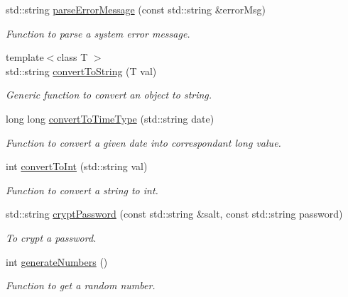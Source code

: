 \begin{DoxyCompactItemize}
std::string \hyperlink{namespacevishnu_aaf3976b9b53965c46bc9bcf847ba286f}{parseErrorMessage} (const std::string \&errorMsg)
\begin{DoxyCompactList}\small\item\em Function to parse a system error message. \item\end{DoxyCompactList}\item 
{\footnotesize template$<$class T $>$ }\\std::string \hyperlink{namespacevishnu_add18720aacc1db6052abecedd5d6feaa}{convertToString} (T val)
\begin{DoxyCompactList}\small\item\em Generic function to convert an object to string. \item\end{DoxyCompactList}\item 
long long \hyperlink{namespacevishnu_ae4208edfb8924443b0971e68cccfce02}{convertToTimeType} (std::string date)
\begin{DoxyCompactList}\small\item\em Function to convert a given date into correspondant long value. \item\end{DoxyCompactList}\item 
int \hyperlink{namespacevishnu_ac1899fb2792ddd63a003a06081fc9066}{convertToInt} (std::string val)
\begin{DoxyCompactList}\small\item\em Function to convert a string to int. \item\end{DoxyCompactList}\item 
std::string \hyperlink{namespacevishnu_a6315b6f5e86d48f4c75dc73d08348edf}{cryptPassword} (const std::string \&salt, const std::string password)
\begin{DoxyCompactList}\small\item\em To crypt a password. \item\end{DoxyCompactList}\item 
int \hyperlink{namespacevishnu_a93bc913d891933b4f9d7bc0382f72425}{generateNumbers} ()
\begin{DoxyCompactList}\small\item\em Function to get a random number. \item\end{DoxyCompactList}\item 

\end{DoxyCompactItemize}
